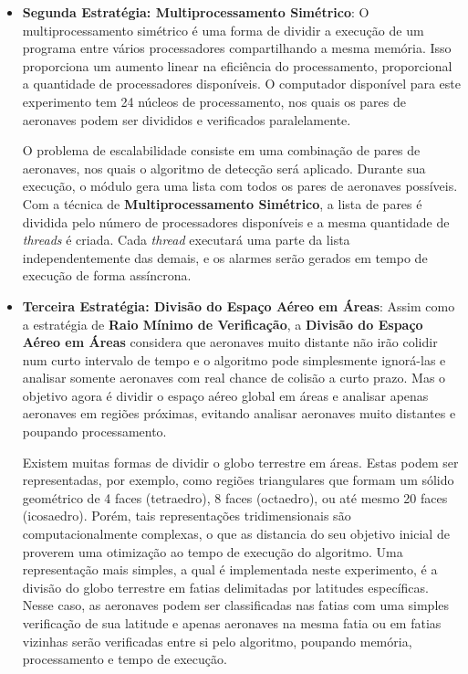 \begin{itemize}
\item \textbf{Segunda Estratégia: Multiprocessamento Simétrico}: O multiprocessamento simétrico é uma forma de dividir a execução de um programa entre vários processadores compartilhando a mesma memória. Isso proporciona um aumento linear na eficiência do processamento, proporcional a quantidade de processadores disponíveis. O computador disponível para este experimento tem 24 núcleos de processamento, nos quais os pares de aeronaves podem ser divididos e verificados paralelamente.

O problema de escalabilidade consiste em uma combinação de pares de aeronaves, nos quais o algoritmo de detecção será aplicado. Durante sua execução, o módulo gera uma lista com todos os pares de aeronaves possíveis. Com a técnica de \textbf{Multiprocessamento Simétrico}, a lista de pares é dividida pelo número de processadores disponíveis e a mesma quantidade de \textit{threads} é criada. Cada \textit{thread} executará uma parte da lista independentemente das demais, e os alarmes serão gerados em tempo de execução de forma assíncrona.


\item \textbf{Terceira Estratégia: Divisão do Espaço Aéreo em Áreas}: Assim como a estratégia de \textbf{Raio Mínimo de Verificação}, a \textbf{Divisão do Espaço Aéreo em Áreas} considera que aeronaves muito distante não irão colidir num curto intervalo de tempo e o algoritmo pode simplesmente ignorá-las e analisar somente aeronaves com real chance de colisão a curto prazo. Mas o objetivo agora é dividir o espaço aéreo global em áreas e analisar apenas aeronaves em regiões próximas, evitando analisar aeronaves muito distantes e poupando processamento. 

Existem muitas formas de dividir o globo terrestre em áreas. Estas podem ser representadas, por exemplo, como regiões triangulares que formam um sólido geométrico de 4 faces (tetraedro), 8 faces (octaedro), ou até mesmo 20 faces (icosaedro). Porém, tais representações tridimensionais são computacionalmente complexas, o que as distancia do seu objetivo inicial de proverem uma otimização ao tempo de execução do algoritmo. Uma representação mais simples, a qual é implementada neste experimento, é a divisão do globo terrestre em fatias delimitadas por latitudes específicas. Nesse caso, as aeronaves podem ser classificadas nas fatias com uma simples verificação de sua latitude e apenas aeronaves na mesma fatia ou em fatias vizinhas serão verificadas entre si pelo algoritmo, poupando memória, processamento e tempo de execução.

\end{itemize}

